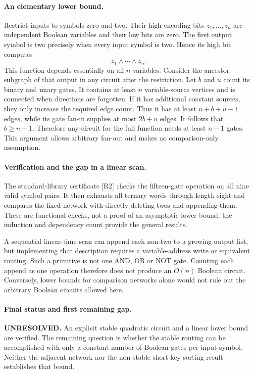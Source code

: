 \documentclass[11pt,a4paper]{article}
\begin{document}
\paragraph{An elementary lower bound.}
Restrict inputs to symbols zero and two. Their high encoding bits
$z_1,\ldots,z_n$ are independent Boolean variables and their low bits
are zero. The first output symbol is two precisely when every input
symbol is two. Hence its high bit computes
\[
                           z_1\wedge\cdots\wedge z_n.
\]
This function depends essentially on all $n$ variables. Consider the
ancestor subgraph of that output in any circuit after the restriction.
Let $b$ and $u$ count its binary and unary gates. It contains at least
$n$ variable-source vertices and is connected when directions are
forgotten. If it has additional constant sources, they only increase
the required edge count. Thus it has at least $n+b+u-1$ edges, while
its gate fan-in supplies at most $2b+u$ edges. It follows that
$b\ge n-1$. Therefore any circuit for the full function needs at
least $n-1$ gates. This argument allows arbitrary fan-out and makes
no comparison-only assumption.

\paragraph{Verification and the gap in a linear scan.}
The standard-library certificate [R2] checks the fifteen-gate operation
on all nine valid symbol pairs. It then exhausts all ternary words
through length eight and compares the fixed network with directly
deleting twos and appending them. These are functional checks, not a
proof of an asymptotic lower bound; the induction and dependency count
provide the general results.

A sequential linear-time scan can append each non-two to a growing
output list, but implementing that description requires a
variable-address write or equivalent routing. Such a primitive is
not one AND, OR or NOT gate. Counting each append as one operation
therefore does not produce an $O(n)$ Boolean circuit. Conversely,
lower bounds for comparison networks alone would not rule out the
arbitrary Boolean circuits allowed here.

\paragraph{Final status and first remaining gap.}
\textbf{UNRESOLVED.} An explicit stable quadratic circuit and a linear
lower bound are verified. The remaining question is whether the stable
routing can be accomplished with only a constant number of Boolean
gates per input symbol. Neither the adjacent network nor the
non-stable short-key sorting result establishes that bound.
\end{document}
